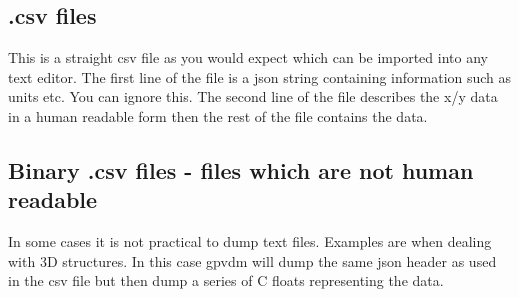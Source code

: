 \subsection{.csv files}
This is a straight csv file as you would expect which can be imported into any text editor.  The first line of the file is a json string containing information such as units etc.  You can ignore this. The second line of the file describes the x/y data in a human readable form then the rest of the file contains the data.

\subsection{Binary .csv files - files which are not human readable}
In some cases it is not practical to dump text files. Examples are when dealing with 3D structures.  In this case gpvdm will dump the same json header as used in the csv file but then dump a series of C floats representing the data.

